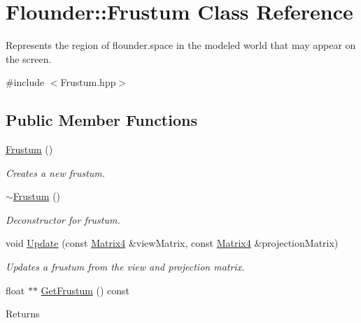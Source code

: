 \hypertarget{class_flounder_1_1_frustum}{}\section{Flounder\+:\+:Frustum Class Reference}
\label{class_flounder_1_1_frustum}


Represents the region of flounder.\+space in the modeled world that may appear on the screen.  




{\ttfamily \#include $<$Frustum.\+hpp$>$}

\subsection*{Public Member Functions}
\begin{DoxyCompactItemize}
\item 
\hyperlink{class_flounder_1_1_frustum_a148f8368655a90d1b4e6e35e1e4bcb2f}{Frustum} ()
\begin{DoxyCompactList}\small\item\em Creates a new frustum. \end{DoxyCompactList}\item 
\hyperlink{class_flounder_1_1_frustum_a5728c1505123142f1fa0da155e3aed0a}{$\sim$\+Frustum} ()
\begin{DoxyCompactList}\small\item\em Deconstructor for frustum. \end{DoxyCompactList}\item 
void \hyperlink{class_flounder_1_1_frustum_a8b6590c2fc46c41f3c8b3a0867dc1d12}{Update} (const \hyperlink{class_flounder_1_1_matrix4}{Matrix4} \&view\+Matrix, const \hyperlink{class_flounder_1_1_matrix4}{Matrix4} \&projection\+Matrix)
\begin{DoxyCompactList}\small\item\em Updates a frustum from the view and projection matrix. \end{DoxyCompactList}\item 
\mbox{\label{class_flounder_1_1_frustum_a3e3014e70c4ecc3277873ff905bab285}} 
float $\ast$$\ast$ \hyperlink{class_flounder_1_1_frustum_a3e3014e70c4ecc3277873ff905bab285}{Get\+Frustum} () const
\begin{DoxyCompactList}\small\item\em \begin{DoxyReturn}{Returns}

\end{DoxyReturn}
\end{DoxyCompactList}$$
\end{DoxyCompactItemize}
